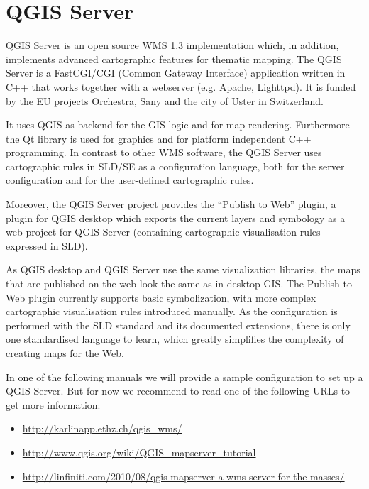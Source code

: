 
\chapter{QGIS Server}\label{label_qgisserver}


QGIS Server is an open source WMS 1.3 implementation which, in addition,
implements advanced cartographic features for thematic mapping. The QGIS
Server is a FastCGI/CGI (Common Gateway Interface) application written in
C++ that works together with a webserver (e.g. Apache, Lighttpd). It is 
funded by the EU projects Orchestra, Sany and the city of Uster in 
Switzerland.

It uses QGIS as backend for the GIS logic and for map rendering. Furthermore the 
Qt library is used for graphics and for platform independent 
C++ programming. In contrast to other WMS software, the QGIS Server uses 
cartographic rules in SLD/SE as a configuration language, both for the server 
configuration and for the user-defined cartographic rules. 

Moreover, the QGIS Server project provides the “Publish to Web” plugin, a 
plugin for QGIS desktop which exports the current layers and symbology as a 
web project for QGIS Server (containing cartographic visualisation rules 
expressed in SLD).

As QGIS desktop and QGIS Server use the same visualization libraries, the
maps that are published on the web look the same as in desktop GIS. The 
Publish to Web plugin currently supports basic symbolization, with more complex 
cartographic visualisation rules introduced manually. As the configuration is 
performed with the SLD standard and its documented extensions, there is only 
one standardised language to learn, which greatly simplifies the complexity 
of creating maps for the Web.

In one of the following manuals we will provide a sample configuration to 
set up a QGIS Server. But for now we recommend to read one of the following 
URLs to get more information:

\begin{itemize}
\item \url{http://karlinapp.ethz.ch/qgis\_wms/} \\
\item \url{http://www.qgis.org/wiki/QGIS\_mapserver\_tutorial} \\
\item \url{http://linfiniti.com/2010/08/qgis-mapserver-a-wms-server-for-the-masses/}
\end{itemize}

